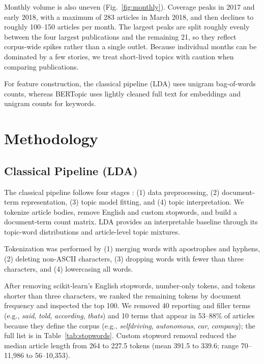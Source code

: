 \documentclass[conference]{IEEEtran}
\begin{document}
Monthly volume is also uneven (Fig.~\ref{fig:monthly}). Coverage peaks in 2017 and early 2018, with a maximum of 283 articles in March 2018, and then declines to roughly 100--150 articles per month. The largest peaks are split roughly evenly between the four largest publications and the remaining 21, so they reflect corpus-wide spikes rather than a single outlet. Because individual months can be dominated by a few stories, we treat short-lived topics with caution when comparing publications.

For feature construction, the classical pipeline (LDA) uses unigram bag-of-words counts, whereas BERTopic uses lightly cleaned full text for embeddings and unigram counts for keywords.

\section*{Methodology}
\subsection*{Classical Pipeline (LDA)}
The classical pipeline follows four stages \cite{qamar2024}: (1) data preprocessing, (2) document-term representation, (3) topic model fitting, and (4) topic interpretation. We tokenize article bodies, remove English and custom stopwords, and build a document-term count matrix. LDA provides an interpretable baseline through its topic-word distributions and article-level topic mixtures.

Tokenization was performed by (1) merging words with apostrophes and hyphens, (2) deleting non-ASCII characters, (3) dropping words with fewer than three characters, and (4) lowercasing all words.

After removing scikit-learn's English stopwords, number-only tokens, and tokens shorter than three characters, we ranked the remaining tokens by document frequency and inspected the top 100. We removed 40 reporting and filler terms (e.g., \textit{said}, \textit{told}, \textit{according}, \textit{thats}) and 10 terms that appear in 53--88\% of articles because they define the corpus (e.g., \textit{selfdriving}, \textit{autonomous}, \textit{car}, \textit{company}); the full list is in Table~\ref{tab:stopwords}. Custom stopword removal reduced the median article length from 264 to 227.5 tokens (mean 391.5 to 339.6; range 70--11,986 to 56--10,353).
\end{document}
